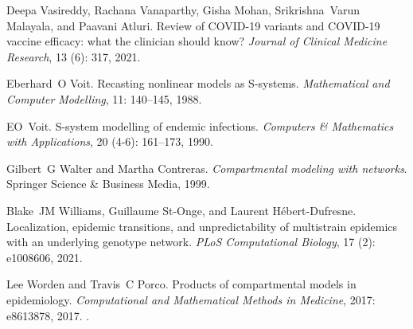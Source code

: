\documentclass{article}
\theoremstyle{definition}
\begin{document}
\begin{thebibliography}{37}
Deepa Vasireddy, Rachana Vanaparthy, Gisha Mohan, Srikrishna~Varun Malayala,
  and Paavani Atluri.
\newblock Review of {COVID-19} variants and {COVID-19} vaccine efficacy: what
  the clinician should know?
\newblock \emph{Journal of Clinical Medicine Research}, 13
  (6): 317, 2021.

Eberhard~O Voit.
\newblock Recasting nonlinear models as {S}-systems.
\newblock \emph{Mathematical and Computer Modelling}, 11: 140--145,
  1988.

EO~Voit.
\newblock S-system modelling of endemic infections.
\newblock \emph{Computers \& Mathematics with Applications}, 20
  (4-6): 161--173, 1990.

Gilbert~G Walter and Martha Contreras.
\newblock \emph{Compartmental modeling with networks}.
\newblock Springer Science \& Business Media, 1999.

Blake~JM Williams, Guillaume St-Onge, and Laurent H{\'e}bert-Dufresne.
\newblock Localization, epidemic transitions, and unpredictability of
  multistrain epidemics with an underlying genotype network.
\newblock \emph{PLoS Computational Biology}, 17 (2):
  e1008606, 2021.

Lee Worden and Travis~C Porco.
\newblock Products of compartmental models in epidemiology.
\newblock \emph{Computational and Mathematical Methods in Medicine},
  2017: e8613878, 2017.
\newblock {}.

\end{thebibliography}
\end{document}

